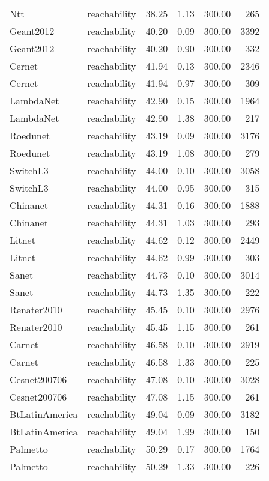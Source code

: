 \begin{tabular}{llrrrr}
Ntt & reachability & 38.25 & 1.13 & 300.00 & 265 \\
Geant2012 & reachability & 40.20 & 0.09 & 300.00 & 3392 \\
Geant2012 & reachability & 40.20 & 0.90 & 300.00 & 332 \\
Cernet & reachability & 41.94 & 0.13 & 300.00 & 2346 \\
Cernet & reachability & 41.94 & 0.97 & 300.00 & 309 \\
LambdaNet & reachability & 42.90 & 0.15 & 300.00 & 1964 \\
LambdaNet & reachability & 42.90 & 1.38 & 300.00 & 217 \\
Roedunet & reachability & 43.19 & 0.09 & 300.00 & 3176 \\
Roedunet & reachability & 43.19 & 1.08 & 300.00 & 279 \\
SwitchL3 & reachability & 44.00 & 0.10 & 300.00 & 3058 \\
SwitchL3 & reachability & 44.00 & 0.95 & 300.00 & 315 \\
Chinanet & reachability & 44.31 & 0.16 & 300.00 & 1888 \\
Chinanet & reachability & 44.31 & 1.03 & 300.00 & 293 \\
Litnet & reachability & 44.62 & 0.12 & 300.00 & 2449 \\
Litnet & reachability & 44.62 & 0.99 & 300.00 & 303 \\
Sanet & reachability & 44.73 & 0.10 & 300.00 & 3014 \\
Sanet & reachability & 44.73 & 1.35 & 300.00 & 222 \\
Renater2010 & reachability & 45.45 & 0.10 & 300.00 & 2976 \\
Renater2010 & reachability & 45.45 & 1.15 & 300.00 & 261 \\
Carnet & reachability & 46.58 & 0.10 & 300.00 & 2919 \\
Carnet & reachability & 46.58 & 1.33 & 300.00 & 225 \\
Cesnet200706 & reachability & 47.08 & 0.10 & 300.00 & 3028 \\
Cesnet200706 & reachability & 47.08 & 1.15 & 300.00 & 261 \\
BtLatinAmerica & reachability & 49.04 & 0.09 & 300.00 & 3182 \\
BtLatinAmerica & reachability & 49.04 & 1.99 & 300.00 & 150 \\
Palmetto & reachability & 50.29 & 0.17 & 300.00 & 1764 \\
Palmetto & reachability & 50.29 & 1.33 & 300.00 & 226 \\

\end{tabular}
